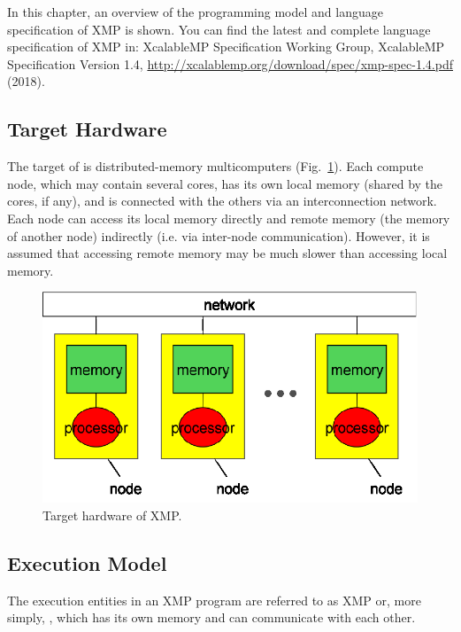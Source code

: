 In this chapter, an overview of the programming model and language
specification of XMP is shown. You can find the latest and complete
language specification of XMP in: XcalableMP Specification Working
Group, XcalableMP Specification Version 1.4,
\url{http://xcalablemp.org/download/spec/xmp-spec-1.4.pdf} (2018).


\subsection{Target Hardware}

The target of {\XMP} is distributed-memory multicomputers
(Fig.~\ref{fig1}). Each compute node, which may contain several
cores, has
its own local memory (shared by the cores, if any), and is connected
with the others via an interconnection network.
%
Each node can access its local memory directly and remote memory (the
memory of another node) indirectly (i.e. via inter-node 
communication). However, it is assumed that accessing remote memory may
be much slower than accessing local memory.

\begin{figure}
  \centering
  \includegraphics[width=12cm]{figs/Fig1.eps}
  \caption{Target hardware of XMP.}\label{fig1}
\end{figure}


\subsection{Execution Model}

The execution entities in an XMP program are referred to as XMP {\nodes}
or, more simply, {\nodes}, which has its own memory and can communicate
with each other.

